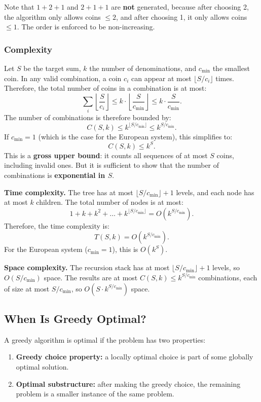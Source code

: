 \documentclass[11pt,a4paper]{article}
\begin{document}
Note that \( 1 + 2 + 1 \) and \( 2 + 1 + 1 \) are \textbf{not} generated, because after choosing 2, the algorithm only allows coins \( \leq 2 \), and after choosing 1, it only allows coins \( \leq 1 \). The order is enforced to be non-increasing.

\subsubsection{Complexity}

Let \( S \) be the target sum, \( k \) the number of denominations, and \( c_{\min} \) the smallest coin. In any valid combination, a coin \( c_i \) can appear at most \( \lfloor S / c_i \rfloor \) times. Therefore, the total number of coins in a combination is at most:
\[
\sum_i \left\lfloor \frac{S}{c_i} \right\rfloor \leq k \cdot \left\lfloor \frac{S}{c_{\min}} \right\rfloor \leq k \cdot \frac{S}{c_{\min}}.
\]
The number of combinations is therefore bounded by:
\[
C(S, k) \leq k^{\lfloor S / c_{\min} \rfloor} \leq k^{S / c_{\min}}.
\]
If \( c_{\min} = 1 \) (which is the case for the European system), this simplifies to:
\[
C(S, k) \leq k^S.
\]
This is a \textbf{gross upper bound}: it counts all sequences of at most \( S \) coins, including invalid ones. But it is sufficient to show that the number of combinations is \textbf{exponential in \( S \)}.

\textbf{Time complexity.} The tree has at most \( \lfloor S / c_{\min} \rfloor + 1 \) levels, and each node has at most \( k \) children. The total number of nodes is at most:
\[
1 + k + k^2 + \dots + k^{\lfloor S / c_{\min} \rfloor} = O\left(k^{S / c_{\min}}\right).
\]
Therefore, the time complexity is:
\[
T(S, k) = O\left(k^{S / c_{\min}}\right).
\]
For the European system (\( c_{\min} = 1 \)), this is \( O(k^S) \).

\textbf{Space complexity.} The recursion stack has at most \( \lfloor S / c_{\min} \rfloor + 1 \) levels, so \( O(S / c_{\min}) \) space. The results are at most \( C(S, k) \leq k^{S / c_{\min}} \) combinations, each of size at most \( S / c_{\min} \), so \( O(S \cdot k^{S / c_{\min}}) \) space.


\subsection{When Is Greedy Optimal?}

A greedy algorithm is optimal if the problem has two properties:
\begin{enumerate}
    \item \textbf{Greedy choice property:} a locally optimal choice is part of some globally optimal solution.
    \item \textbf{Optimal substructure:} after making the greedy choice, the remaining problem is a smaller instance of the same problem.
\end{enumerate}
\end{document}
